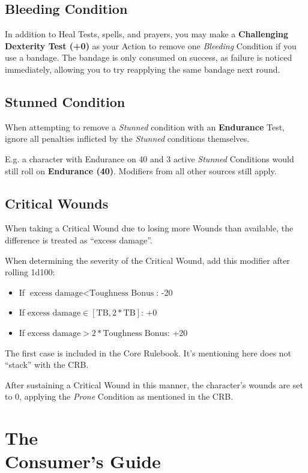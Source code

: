 \documentclass[parskip=full,11pt]{wfrp-short}
\begin{document}
\subsection{Bleeding Condition}
In addition to Heal Tests, spells, and prayers, you may make a
\textbf{Challenging Dexterity Test (+0)} as your Action to remove one
\textit{Bleeding} Condition if you use a bandage.
The bandage is only consumed on success, as failure is noticed immediately,
allowing you to try reapplying the same bandage next round.

\subsection{Stunned Condition}
When attempting to remove a \textit{Stunned} condition with an
\textbf{Endurance} Test, ignore all penalties inflicted by the \textit{Stunned}
conditions themselves.

E.g. a character with Endurance on 40 and 3 active \textit{Stunned} Conditions
would still roll on \textbf{Endurance (40)}.
Modifiers from all other sources still apply.

\subsection{Critical Wounds}
When taking a Critical Wound due to losing more Wounds than available, the
difference is treated as \enquote{excess damage}.

When determining the severity of the Critical Wound, add this modifier after
rolling 1d100:
\begin{itemize}
    \item If $\text{excess damage} < \text{Toughness Bonus}$: -20
    \item If $\text{excess damage} \in [\text{TB}, 2*\text{TB}]$: +0
    \item If $\text{excess damage} > 2* \text{Toughness Bonus}$: +20
\end{itemize}

The first case is included in the Core Rulebook.
It's mentioning here does not \enquote{stack} with the CRB.

After sustaining a Critical Wound in this manner, the character's wounds are
set to 0, applying the \textit{Prone} Condition as mentioned in the CRB.

\section{The\\Consumer's Guide}
\end{document}
